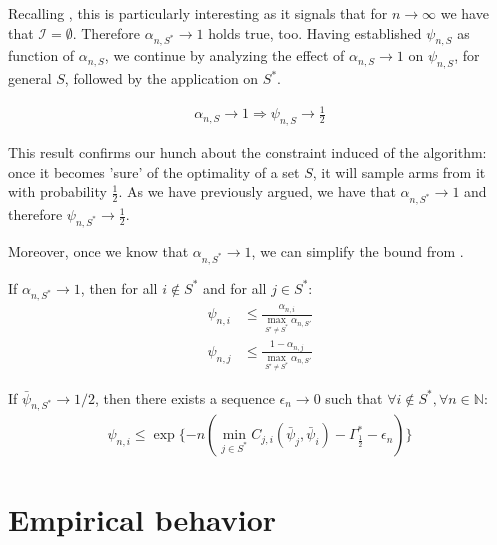 Recalling , this is particularly interesting as it signals that for $n \rightarrow \infty$ we have that $\mathcal{I} = \emptyset$. Therefore $\alpha_{n, S^*} \rightarrow 1$ holds true, too.
Having established $\psi_{n, S}$ as function of $\alpha_{n, S}$, we continue by analyzing the effect of $\alpha_{n, S} \rightarrow 1$ on $\psi_{n, S}$, for general $S$, followed by the application on $S^*$.
\begin{lemma}\label{lemma:psi_convergence}
  \begin{align}
    \alpha_{n, S} \rightarrow 1 \Rightarrow \psi_{n, S} \rightarrow \frac{1}{2}
  \end{align}
\end{lemma}
This result confirms our hunch about the constraint induced of the algorithm:
once it becomes 'sure' of the optimality of a set $S$, it will sample arms from
it with probability $\frac{1}{2}$. As we have previously argued, we have that
$\alpha_{n, S^*} \rightarrow 1$ and therefore $\psi_{n, S^*} \rightarrow
\frac{1}{2}$.

Moreover, once we know that $\alpha_{n, S^*} \rightarrow 1$, we can simplify the
bound from .
\begin{lemma}\label{lemma:measurement_plan_bound_max}
  If $\alpha_{n, S^*} \rightarrow 1$, then for all $i \notin S^*$ and for all
  $j \in S^*$:
  \begin{align}
    \psi_{n, i} &\leq \frac{\alpha_{n, i}}{\max_{S' \neq S^*} \alpha_{n, S'}} \\
    \psi_{n, j} &\leq \frac{1 - \alpha_{n, j}}{\max_{S' \neq S^*} \alpha_{n,
        S'}}
  \end{align}
\end{lemma}

\begin{lemma}\label{lemma:fraction_bound}
  If $\bar{\psi}_{n, S^*} \rightarrow 1/2$, then there exists a sequence
  $\epsilon_n \rightarrow 0$ such that $\forall i \notin S^*, \forall n \in
  \mathbb{N}$:
  \begin{align}
    \psi_{n, i} \leq \exp\{-n( \min_{j \in S^*} C_{j, i}(\bar{\psi}_j,
        \bar{\psi}_i) - \Gamma^*_{\frac{1}{2}} - \epsilon_n) \}
  \end{align}
\end{lemma}

\section{Empirical behavior}\label{section:empirical_behavior}

